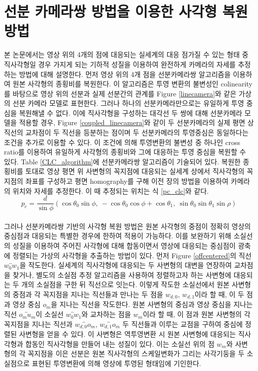 \documentclass[master,korean,final]{cbnu-ecs}
\begin{document}
\section{선분 카메라쌍 방법을 이용한 사각형 복원 방법}
본 논문에서는 영상 위의 4개의 점에 대응되는 실세계의 대응 점가질 수 있는 형태 중 직사각형일 경우 가지게 되는 기하적 성질을 이용하여 완전하게 카메라의 자세를 추정하는 방법에 대해 설명한다. 먼저 영상 위의 4개 점을 선분카메라쌍 알고리즘\cite{Lee2012,Lee2013}을 이용하여 원본 사각형의 종횡비를 복원한다. 이 알고리즘은 투영 변환의 불변성인 colinearity를 바탕으로 영상 위의 선분과 실제 선분간의 관계를 Figure \ref{linecamera}와 같은 가상의 선분 카메라 모델로 표현한다. 그러나 하나의 선분카메라만으로는 유일하게 투영 중심을 복원해낼 수 없다. 이에 직사각형을 구성하는 대각선 두 쌍에 대해 선분카메라 모델을 적용할 경우, Figure \ref{coupled_linecamera}와 같이 두 선분카메라의 실제 평면 상 직선의 교차점이 두 직선을 등분하는 점이며 두 선분카메라의 투영중심은 동일하다는 조건을 추가로 이용할 수 있다. 이 조건에 의해 투영변환의 불변성 중 하나인 cross ratio를 이용하여 유일하게 사각형의 종횡비와 그에 대응하는 투영 중심을 복원할 수 있다. Table \ref{CLC_algorithm}에 선분카메라쌍 알고리즘이 기술되어 있다. 복원한 종횡비를 토대로 영상 평면 위 사변형의 꼭지점에 대응되는 실세계 상에서 직사각형의 꼭지점의 좌표를 구성하고 평면 homography를 구해 이전 장의 방법을 이용하여 카메라의 위치와 자세를 추정한다. 이 때 추정되는 위치는 식 \ref{pc_clc}와 같다.
\begin{equation}
\label{pc_clc}
p_c = \frac{d}{\sin\phi}(\cos\theta_0\sin\phi,\ -\cos\theta_0\cos\phi+\cos\theta_1,\ \sin\theta_0\sin\theta_1\sin\rho)
\end{equation}
\\
그러나 선분카메라쌍 기반의 사각형 복원 방법은 원본 사각형의 중점이 정확히 영상의 중심점과 대응되는 특별한 경우에 한하여 적용이 가능하다. 이를 보완하기 위해 소실선의 성질을 이용하여 주어진 사각형에 대해 합동이면서 영상에 대응되는 중심점이 광축에 정렬되는 가상의 사각형을 추출하는 방법이 있다\cite{Lee2014}. 먼저 Figure \ref{offcentered}의 직선 $\overleftrightarrow{w_0 w_1}$을 작도한다. 실세계의 직사각형에 대응되는 두 사변형의 대변을 연장하여 교차점을 찾거나, 별도의 소실점 추정 알고리즘을 사용하여 정렬하고자 하는 사변형에 대응되는 두 개의 소실점을 구한 뒤 직선으로 잇는다. 이렇게 작도한 소실선에서 원본 사변형의 중점과 각 꼭지점을 지나는 직선들과 만나는 두 점을 $w_{d,0}$, $w_{d,1}$이라 할 때, 이 두 점과 영상 중심 $o_m$을 지나는 직선을 작도한다. 원본 사변형의 중심과 영상 중심을 지나는 직선 $\overleftrightarrow{o_m u_m}$이 소실선 $\overleftrightarrow{w_0 w_1}$와 교차하는 점을 $w_m$이라 할 때, 이 점과 원본 사변형의 각 꼭지점을 지나는 직선과 $\overleftrightarrow{w_{d,0} o_m}$, $\overleftrightarrow{w_{d,1} o_m}$ 두 직선들과 이루는 교점을 구하여 중심에 정렬된 사변형을 얻을 수 있다. 이 사변형은 역투영변환 시 원본 사변형에 대응되는 직사각형과 합동인 직사각형을 만들어 내는 성질이 있다. 이는 소실선 위의 점 $w_m$와 사변형의 각 꼭지점을 이은 선분은 원본 직사각형의 스케일변화가 그리는 사각기둥을 두 소실점으로 표현된 투영변환에 의해 영상에 투영된 형태임에 기인한다.
\end{document}

